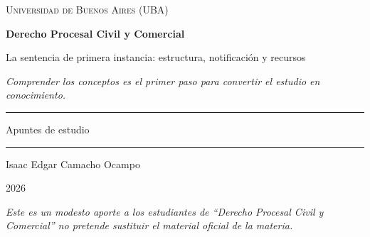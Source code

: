 \documentclass[12pt,oneside]{book}
\newcommand{\universidad}{Universidad de Buenos Aires (UBA)}
\newcommand{\materia}{Derecho Procesal Civil y Comercial}
\newcommand{\subtitulo}{La sentencia de primera instancia: estructura, notificaci\'on y recursos}
\newcommand{\autor}{Isaac Edgar Camacho Ocampo}
\newcommand{\anio}{2026}
\begin{document}

\begin{titlepage}

\thispagestyle{empty}

\begin{center}

\vspace*{1cm}

{\large \textsc{\universidad}}

\vspace{3cm}

{\Huge \textbf{\materia}}

\vspace{1cm}

{\LARGE \subtitulo}

\vspace{0.8cm}

\textit{Comprender los conceptos es el primer paso para convertir el estudio en conocimiento.}

\vspace{1.2cm}

\rule{0.70\textwidth}{0.5pt}

\vspace{0.5cm}

{\large Apuntes de estudio}

\vspace{0.5cm}

\rule{0.70\textwidth}{0.5pt}

\vfill

{\large \autor}

\vspace{0.3cm}

{\large \anio}

\end{center}

\vfill

\begin{flushleft}
\textit{Este es un modesto aporte a los estudiantes de ``Derecho Procesal Civil y Comercial'' no pretende sustituir el material oficial de la materia.}
\end{flushleft}

\end{titlepage}

\frontmatter
\tableofcontents
\mainmatter
\end{document}
